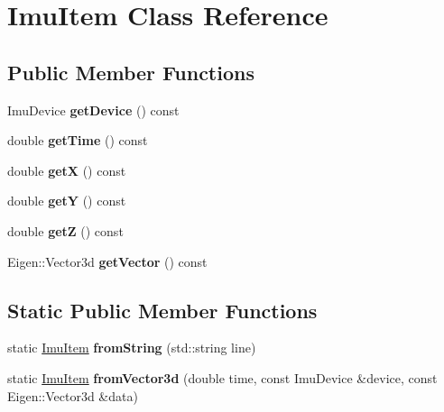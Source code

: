 \hypertarget{class_imu_item}{\section{Imu\-Item Class Reference}
\label{class_imu_item}
}
\subsection*{Public Member Functions}
\begin{DoxyCompactItemize}
\item 
\hypertarget{class_imu_item_ac12a9c7f77a7318de5893a26284c8f12}{Imu\-Device {\bfseries get\-Device} () const }\label{class_imu_item_ac12a9c7f77a7318de5893a26284c8f12}

\item 
\hypertarget{class_imu_item_adf0603391765e4950651ee67fe2273b7}{double {\bfseries get\-Time} () const }\label{class_imu_item_adf0603391765e4950651ee67fe2273b7}

\item 
\hypertarget{class_imu_item_a9fe54cf71ea23dc3f044bf849a50743b}{double {\bfseries get\-X} () const }\label{class_imu_item_a9fe54cf71ea23dc3f044bf849a50743b}

\item 
\hypertarget{class_imu_item_af969726f713eb67b6b544133bea5fd21}{double {\bfseries get\-Y} () const }\label{class_imu_item_af969726f713eb67b6b544133bea5fd21}

\item 
\hypertarget{class_imu_item_af010fd2fd5ecd5868764a760f6040af5}{double {\bfseries get\-Z} () const }\label{class_imu_item_af010fd2fd5ecd5868764a760f6040af5}

\item 
\hypertarget{class_imu_item_a1cd4668ce368cb3b8360f42a1ab97580}{Eigen\-::\-Vector3d {\bfseries get\-Vector} () const }\label{class_imu_item_a1cd4668ce368cb3b8360f42a1ab97580}

\end{DoxyCompactItemize}
\subsection*{Static Public Member Functions}
\begin{DoxyCompactItemize}
\item 
\hypertarget{class_imu_item_af127ca299205f31693ed6a85330bf915}{static \hyperlink{class_imu_item}{Imu\-Item} {\bfseries from\-String} (std\-::string line)}\label{class_imu_item_af127ca299205f31693ed6a85330bf915}

\item 
\hypertarget{class_imu_item_a0a28edeccaf5f42fabf05e76c5c46519}{static \hyperlink{class_imu_item}{Imu\-Item} {\bfseries from\-Vector3d} (double time, const Imu\-Device \&device, const Eigen\-::\-Vector3d \&data)}\label{class_imu_item_a0a28edeccaf5f42fabf05e76c5c46519}

\end{DoxyCompactItemize}
